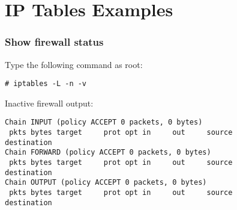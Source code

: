 \chapter{IP Tables Examples\cite{9}}
\subsection{Show firewall status}

Type the following command as root:

\begin{verbatim}
# iptables -L -n -v
\end{verbatim}

Inactive firewall output:
\begin{verbatim}
Chain INPUT (policy ACCEPT 0 packets, 0 bytes)
 pkts bytes target     prot opt in     out     source               destination
Chain FORWARD (policy ACCEPT 0 packets, 0 bytes)
 pkts bytes target     prot opt in     out     source               destination
Chain OUTPUT (policy ACCEPT 0 packets, 0 bytes)
 pkts bytes target     prot opt in     out     source               destination
\end{verbatim}


